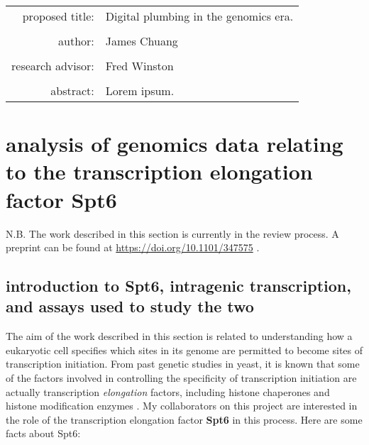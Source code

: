 \documentclass[11pt, a4paper]{article}
\begin{document}
\begin{titlepage}
\begin{tabular}{ r l }
 proposed title:   & Digital plumbing in the genomics era. \\
 		   & \\
 author:	   & James Chuang \\
 		   & \\
 research advisor: & Fred Winston \\
 		   & \\
 abstract:	   & Lorem ipsum.
\end{tabular}
\end{titlepage}

\tableofcontents
\newpage

\section{analysis of genomics data relating to the transcription elongation factor Spt6}

N.B. The work described in this section is currently in the review process. A preprint can be found at \url{https://doi.org/10.1101/347575} \cite{doris2018}.

\subsection{introduction to Spt6, intragenic transcription, and assays used to study the two}

The aim of the work described in this section is related to understanding how a eukaryotic cell specifies which sites in its genome are permitted to become sites of transcription initiation. From past genetic studies in yeast, it is known that some of the factors involved in controlling the specificity of transcription initiation are actually transcription \textit{elongation} factors, including histone chaperones and histone modification enzymes \cite{kaplan2003, cheung2008, hennig2013}. My collaborators on this project are interested in the role of the transcription elongation factor \textbf{Spt6} in this process. Here are some facts about Spt6:
\end{document}

